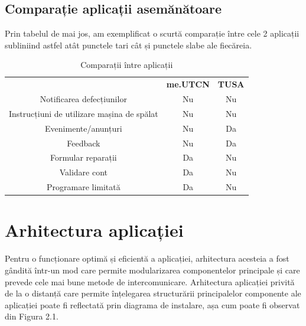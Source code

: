 \documentclass[12pt,a4paper]{report}
\theoremstyle{definition}
\theoremstyle{remark}
\begin{document}
\vspace{15mm}

\section{Comparație aplicații asemănătoare}
\par Prin tabelul de mai jos, am exemplificat o scurtă comparație între cele 2 aplicații subliniind astfel atât punctele tari cât și punctele slabe ale fiecăreia.

\begin{table}[H]
    \centering
    \begin{tabular}{ccc}
        & \textbf{me.UTCN} & \textbf{TUSA} \\
        Notificarea defecțiunilor                      & Nu               & Nu            \\
        Instrucțiuni de utilizare mașina de spălat     & Nu               & Nu            \\
        Evenimente/anunțuri                            & Nu               & Da            \\
        Feedback                                       & Nu               & Da            \\
        Formular reparații                             & Da               & Nu            \\
        Validare cont                                  & Da               & Nu            \\
        Programare limitată                            & Da               & Nu            \\
    \end{tabular}
    \caption{Comparații între aplicații\label{comparatii-intre-aplicatii}}
\end{table}

\chapter{Arhitectura aplicației}
\par Pentru o funcționare optimă și eficientă a aplicației, arhitectura acesteia a fost gândită într-un mod care permite modularizarea componentelor principale și care prevede cele mai bune metode de intercomunicare. Arhitectura aplicației privită de la o distanță care permite înțelegarea structurării principalelor componente ale aplicației poate fi reflectată prin diagrama de instalare, așa cum poate fi observat din Figura 2.1.
\end{document}
